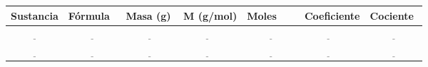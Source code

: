 \documentclass[
  spanish,
  letterpaper,
  12pt,
  oneside,
  open=any]{scrbook}
\newcounter{none} %
\begin{document}
{\def\LTcaptype{none} %
\begin{longtable}[]{@{}
  >{\raggedright\arraybackslash}p{}
  >{\raggedright\arraybackslash}p{}
  >{\raggedright\arraybackslash}p{}
  >{\raggedright\arraybackslash}p{}
  >{\raggedright\arraybackslash}p{}
  >{\raggedright\arraybackslash}p{}
  >{\raggedright\arraybackslash}p{}@{}}
\toprule\noalign{}
\begin{minipage}[b]{\linewidth}\raggedright
Sustancia
\end{minipage} & \begin{minipage}[b]{\linewidth}\raggedright
Fórmula
\end{minipage} & \begin{minipage}[b]{\linewidth}\raggedright
Masa (g)
\end{minipage} & \begin{minipage}[b]{\linewidth}\raggedright
M (g/mol)
\end{minipage} & \begin{minipage}[b]{\linewidth}\raggedright
Moles
\end{minipage} & \begin{minipage}[b]{\linewidth}\raggedright
Coeficiente
\end{minipage} & \begin{minipage}[b]{\linewidth}\raggedright
Cociente
\end{minipage} \\
\midrule\noalign{}
\endhead
\bottomrule\noalign{}
\endlastfoot
\(\underline{\hspace{2cm}}\) & \(\underline{\hspace{2cm}}\) &
\(\underline{\hspace{2cm}}\) & \(\underline{\hspace{2cm}}\) &
\(\underline{\hspace{2cm}}\) & \(\underline{\hspace{2cm}}\) &
\(\underline{\hspace{2cm}}\) \\
\(\underline{\hspace{2cm}}\) & \(\underline{\hspace{2cm}}\) &
\(\underline{\hspace{2cm}}\) & \(\underline{\hspace{2cm}}\) &
\(\underline{\hspace{2cm}}\) & \(\underline{\hspace{2cm}}\) &
\(\underline{\hspace{2cm}}\) \\
\end{longtable}
}
\end{document}
